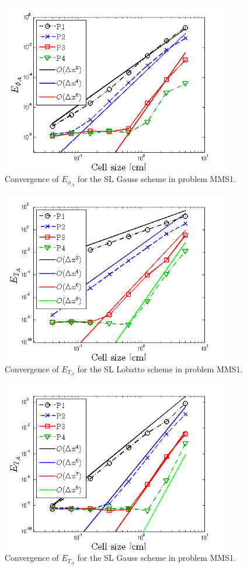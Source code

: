 %
%
\begin{figure}[!hbp]
\centering
\includegraphics[width=10cm]{chapter6_grey_radtran/Dissertation_Data/MMS2_SLXS_Gauss_phi_A.png}
\caption{Convergence of $E_{\phi_A}$ for the SL Gauss scheme in problem MMS1.}
\label{fig:mms1_gauss_phi_A}
\end{figure}
%
%
\begin{figure}[!htp]
\centering
\includegraphics[width=10cm]{chapter6_grey_radtran/Dissertation_Data/MMS2_SLXS_Lobatto_temp_A.png}
\caption{Convergence of $E_{T_A}$ for the SL Lobatto scheme in problem MMS1.}
\label{fig:mms1_lobatto_temp_A}
\end{figure}
%
%
\begin{figure}[!hbp]
\centering
\includegraphics[width=10cm]{chapter6_grey_radtran/Dissertation_Data/MMS2_SLXS_Gauss_temp_A.png}
\caption{Convergence of $E_{T_A}$ for the SL Gauss scheme in problem MMS1.}
\label{fig:mms1_gauss_temp_A}
\end{figure}

